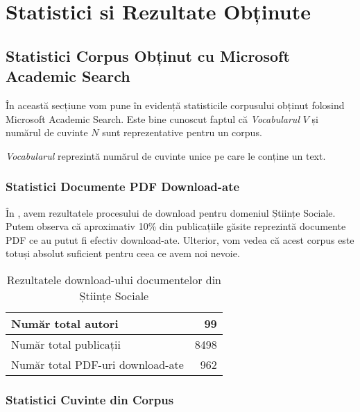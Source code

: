 \chapter{Statistici si Rezultate Obținute}
\label{chapter:measurements}

\section{Statistici Corpus Obținut cu Microsoft Academic Search}

În această secțiune vom pune în evidență statisticile corpusului obținut folosind Microsoft Academic Search. Este bine cunoscut faptul că \textit{Vocabularul} $V$ și numărul de cuvinte $N$ sunt reprezentative pentru un corpus.


\textit{Vocabularul} reprezintă numărul de cuvinte unice pe care le conține un text.


\subsection{Statistici Documente PDF Download-ate}

În , avem rezultatele procesului de download pentru domeniul Științe Sociale. Putem observa că aproximativ 10\% din publicațiile găsite reprezintă documente PDF ce au putut fi efectiv download-ate. Ulterior, vom vedea că acest corpus este totuși absolut suficient pentru ceea ce avem noi nevoie.

\begin{center}
\begin{table}[htb]
  \caption{Rezultatele download-ului documentelor din Științe Sociale}
  \begin{tabular}{|l|r|}
    \hline
    Număr total autori & 99 \\
    \hline
    Număr total publicații & 8498 \\
     \hline
    Număr total PDF-uri download-ate & 962  \\
     \hline
  \end{tabular}
  \label{table:downloaded-pdf-summary}
\end{table}
\end{center}

\subsection{Statistici Cuvinte din Corpus}

